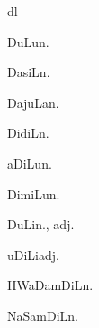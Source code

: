 \begin{multicols*}{2}
\begin{dictroot}{d}{l}
\begin{dictentry}{DuLu}{n.}
{        }
    \end{dictentry}
    \begin{dictentry}{DasiL}{n.}
        \dictdef*{

        }
    \end{dictentry}
    \begin{dictentry}{DajuLa}{n.}
    \end{dictentry}
    \begin{dictentry}{DidiL}{n.}
        \dictdef*{

        }
    \end{dictentry}
    \begin{dictentry}{aDiLu}{n.}
    \end{dictentry}
    \begin{dictentry}{DimiLu}{n.}
        \dictdef*{

        }
    \end{dictentry}
    \begin{dictentry}{DuLi}{n., adj.}
        \dictdef*{

        }
    \end{dictentry}
    \begin{dictentry}{uDiLi}{adj.}
        \dictdef*{

        }
    \end{dictentry}

    \begin{dictentry}{HWaDamDiL}{n.}
    \end{dictentry}
    \begin{dictentry}{NaSamDiL}{n.}
    \end{dictentry}
\end{dictroot}


\end{multicols*}
